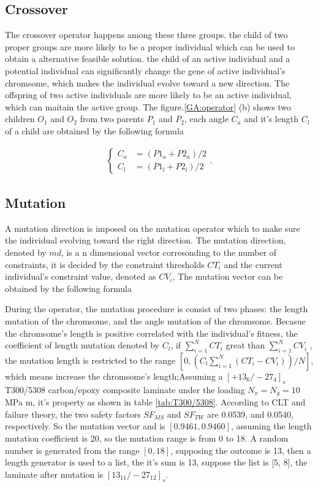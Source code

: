 \subsection{Crossover}
The crossover operator happens among these three groups. the child of two proper
groups are more likely to be a proper individual which can be used to obtain a
alternative feasible solution. the child of an active individual and a potential
individual can significantly change the gene of active individual's chromsome,
which makes the individual evolve toward a new direction. The offspring of two
active individuals are more likely to be an active individual, which can maitain
the active group.  The figure.\ref{GA:operator} (b) shows two children $O_1$
and $O_2$ from two parents $P_1$ and $P_2$, each angle $C_a$ and it's length 
$C_l$ of a child are obtained by the following formula

\begin{align} 
	\begin{cases}
	C_a &= (P1_a + P2_a)/2 \\
	C_l &= (P1_l + P2_l)/2 
\end{cases} \textstyle{.}
\end{align}

\subsection{Mutation}
A mutation direction is imposed on the mutation operator which to make sure the
individual evolving toward the right direction. The mutation direction, denoted
by $md$, is a n dimensional vector corresonding to the number of constraints, it
is decided by the constraint thresholds $CT_i$ and the current individual's
constraint value, denoted as $CV_i$,  The mutation vector can be obtained by the
following formula


During the operator, the mutation procedure is consist of two phases: the length
mutation of the chromsome, and the angle mutation of the chromsome.  Becasue the
chromsome's length is positive correlated with the individual's fitness, the
coefficient of length mutation denoted by $C_l$, if $\sum_{i=1}^{N}{CT_i}$ great
than $\sum_{i=1}^{N}{CV_i}$ , the mutation length is restricted to the range
$[0,(C_l \sum_{i=1}^{N}{(CT_i-CV_i)})/N]$, which means increase the chromsome's
length;Assuming a $[+13_6/-27_4]_s$ T300/5308 carbon/epoxy composite
laminate under the loading $N_{x} = N_{y} = 10$ MPa m, it's property as shown
in table \ref{tab:T300/5308}. According to CLT and
failure theory, the two safety factors $SF_{MS}$ and $SF_{TW}$ are  0.0539, and
0.0540, respectively. So the mutation vector and is $[0.9461,0.9460]$, assuming
the length mutation coefficient is 20, so the mutation range is from 0 to 18. A
random number is generated from the range $[0, 18]$, supposing the outcome is
13, then a length generator is used to a list, the it's sum is 13, suppose the
list is [5, 8], the laminate after mutation is $[13_{11}/-27_{12}]_s$.

